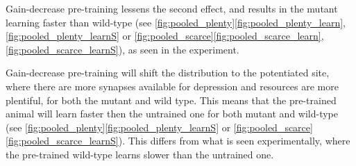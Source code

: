 \documentclass[12pt]{article}
\begin{document}
Gain-decrease pre-training lessens the second effect, and results in the mutant learning faster than wild-type (see \autoref{fig:pooled_plenty}\ref{fig:pooled_plenty_learn},\ref{fig:pooled_plenty_learnS} or \autoref{fig:pooled_scarce}\ref{fig:pooled_scarce_learn},\ref{fig:pooled_scarce_learnS}), as seen in the experiment.

Gain-decrease pre-training will shift the distribution to the potentiated site, where there are more synapses available for depression and resources are more plentiful, for both the mutant and wild type.
This means that the pre-trained animal will learn faster then the untrained one for both mutant and wild-type (see \autoref{fig:pooled_plenty}\ref{fig:pooled_plenty_learnS} or \autoref{fig:pooled_scarce}\ref{fig:pooled_scarce_learnS}).
This differs from what is seen experimentally, where the pre-trained wild-type learns slower than the untrained one.















\end{document}
